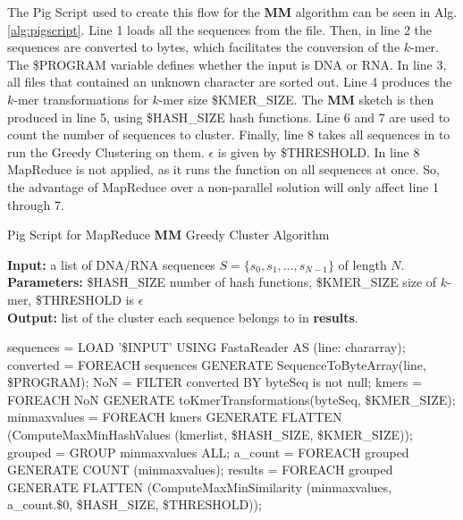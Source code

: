 \documentclass[../../main.tex]{subfiles}
\begin{document}
The Pig Script used to create this flow for the {\bf MM} algorithm can be seen in Alg. \ref{alg:pigscript}. Line 1 loads all the sequences from the file. Then, in line 2 the sequences are converted to bytes, which facilitates the conversion of the $k$-mer. The \$PROGRAM variable defines whether the input is DNA or RNA. In line 3, all files that contained an unknown character are sorted out. Line 4 produces the $k$-mer transformations for $k$-mer size \$KMER\_SIZE. The {\bf MM} sketch is then produced in line 5, using \$HASH\_SIZE hash functions. Line 6 and 7 are used to count the number of sequences to cluster. Finally, line 8 takes all sequences in to run the Greedy Clustering on them. $\epsilon$ is given by \$THRESHOLD. In line 8 MapReduce is not applied, as it runs the function on all sequences at once. So, the advantage of MapReduce over a non-parallel solution will only affect line 1 through 7.
\begin{algorithm}
\caption{Pig Script for MapReduce {\bf MM} Greedy Cluster Algorithm}\label{alg:pigscript}
\textbf{Input:} a list of DNA/RNA sequences $S=\{s_0,s_1,...,s_{N-1}\}$ of length $N$.\\
\textbf{Parameters:} \$HASH\_SIZE number of hash functions, \$KMER\_SIZE size of $k$-mer,	\$THRESHOLD is $\epsilon$\\
\textbf{Output:} list of the cluster each sequence belongs to in \textbf{results}.
\begin{algorithmic}[1]
\State sequences = LOAD '\$INPUT' USING FastaReader AS (line: chararray);
\State converted = FOREACH sequences GENERATE SequenceToByteArray(line, \$PROGRAM);
\State NoN = FILTER converted BY byteSeq is not null;
\State kmers = FOREACH NoN GENERATE toKmerTransformations(byteSeq, \$KMER\_SIZE);
\State minmaxvalues = FOREACH kmers GENERATE FLATTEN (ComputeMaxMinHashValues (kmerlist, \$HASH\_SIZE, \$KMER\_SIZE));
\State grouped = GROUP minmaxvalues ALL;
\State a\_count = FOREACH grouped GENERATE COUNT (minmaxvalues);
\State results = FOREACH grouped GENERATE FLATTEN (ComputeMaxMinSimilarity (minmaxvalues, a\_count.\$0, \$HASH\_SIZE, \$THRESHOLD));
\end{algorithmic}
\end{algorithm}
\end{document}
